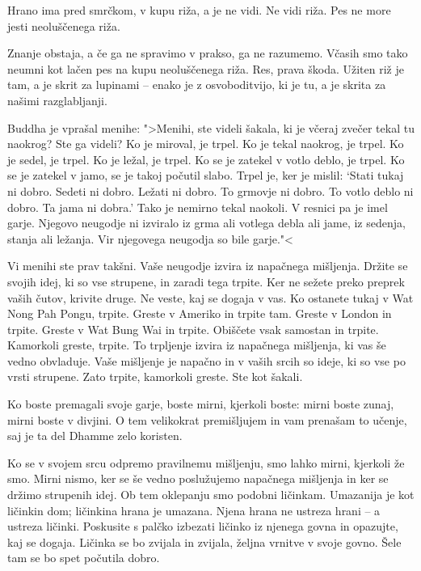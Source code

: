 Hrano ima pred smrčkom, v kupu riža, a je ne vidi. Ne vidi riža. Pes ne more jesti neoluščenega riža.

Znanje obstaja, a če ga ne spravimo v prakso, ga ne razumemo. Včasih smo tako neumni kot lačen pes na kupu neoluščenega riža. Res, prava škoda. Užiten riž je tam, a je skrit za lupinami – enako je z osvoboditvijo, ki je tu, a je skrita za našimi razglabljanji.

\clearpage


Buddha je vprašal menihe: ">Menihi, ste videli šakala, ki je včeraj zvečer tekal tu naokrog? Ste ga videli? Ko je miroval, je trpel. Ko je tekal naokrog, je trpel. Ko je sedel, je trpel. Ko je ležal, je trpel. Ko se je zatekel v votlo deblo, je trpel. Ko se je zatekel v jamo, se je takoj počutil slabo. Trpel je, ker je mislil: `Stati tukaj ni dobro. Sedeti ni dobro. Ležati ni dobro. To grmovje ni dobro. To votlo deblo ni dobro. Ta jama ni dobra.' Tako je nemirno tekal naokoli. V resnici pa je imel garje. Njegovo neugodje ni izviralo iz grma ali votlega debla ali jame, iz sedenja, stanja ali ležanja. Vir njegovega neugodja so bile garje."<

Vi menihi ste prav takšni. Vaše neugodje izvira iz napačnega mišljenja. Držite se svojih idej, ki so vse strupene, in zaradi tega trpite. Ker ne sežete preko preprek vaših čutov, krivite druge. Ne veste, kaj se dogaja v vas. Ko ostanete tukaj v Wat Nong Pah Pongu, trpite. Greste v Ameriko in trpite tam. Greste v London in trpite. Greste v Wat Bung Wai in trpite. Obiščete vsak samostan in trpite. Kamorkoli greste, trpite. To trpljenje izvira iz napačnega mišljenja, ki vas še vedno obvladuje. Vaše mišljenje je napačno in v vaših srcih so ideje, ki so vse po vrsti strupene. Zato trpite, kamorkoli greste. Ste kot šakali.

Ko boste premagali svoje garje, boste mirni, kjerkoli boste: mirni boste zunaj, mirni boste v divjini. O tem velikokrat premišljujem in vam prenašam to učenje, saj je ta del Dhamme zelo koristen.

\enlargethispage{\baselineskip}

\clearpage


Ko se v svojem srcu odpremo pravilnemu mišljenju, smo lahko mirni, kjerkoli že smo. Mirni nismo, ker se še vedno poslužujemo napačnega mišljenja in ker se držimo strupenih idej. Ob tem oklepanju smo podobni ličinkam. Umazanija je kot ličinkin dom; ličinkina hrana je umazana. Njena hrana ne ustreza hrani – a ustreza ličinki. Poskusite s palčko izbezati ličinko iz njenega govna in opazujte, kaj se dogaja. Ličinka se bo zvijala in zvijala, željna vrnitve v svoje govno. Šele tam se bo spet počutila dobro.


